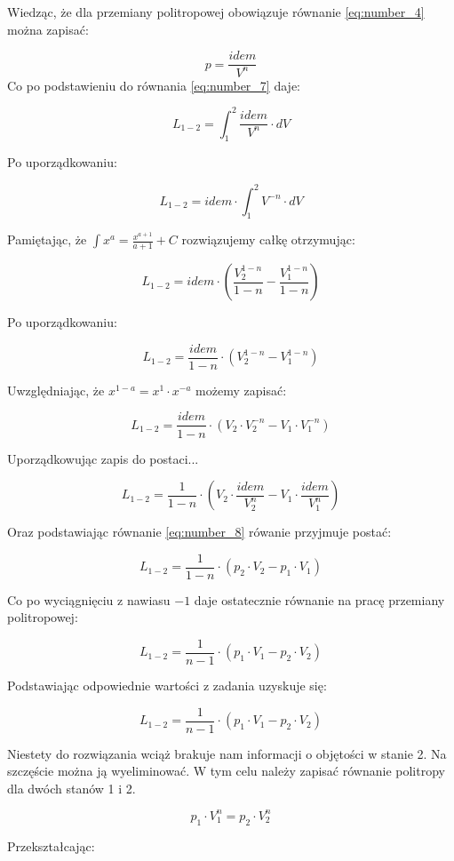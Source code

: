 Wiedząc, że dla przemiany politropowej obowiązuje równanie \eqref{eq:number_4} można zapisać:

\begin{equation}
p = \frac{idem}{V^n}
\label{eq:number_8}
\end{equation}
Co po podstawieniu do równania \eqref{eq:number_7} daje:

\[L_{1-2} = \int_1^2 {\frac{idem}{V^n} \cdot dV} \]

Po uporządkowaniu:

\[L_{1-2} = idem \cdot \int_1^2 V^{-n} \cdot dV \]

Pamiętając, że $\int x^a = \frac{x^{a+1}}{a+1} + C$ rozwiązujemy całkę otrzymując:

\[L_{1-2} = idem \cdot \left( \frac{V_2 ^{1-n}}{1-n} - \frac{V_1 ^{1-n}}{1-n} \right)\]

Po uporządkowaniu:

\[L_{1-2} = \frac{idem}{1-n} \cdot \left( V_2 ^{1-n} - V_1 ^{1-n} \right)\]

Uwzględniając, że $x^{1-a} = x^1 \cdot x^{-a}$ możemy zapisać:

\[L_{1-2} = \frac{idem}{1-n} \cdot \left( V_2 \cdot V_2^{-n} - V_1 \cdot V_1^{-n} \right)\]

Uporządkowując zapis do postaci...

\[L_{1-2} = \frac{1}{1-n} \cdot \left( V_2 \cdot \frac {idem}{V_2^{n}} - V_1 \cdot \frac{idem}{V_1^{n}} \right)\]

Oraz podstawiając równanie \eqref{eq:number_8} rówanie przyjmuje postać:

\[L_{1-2} = \frac{1}{1-n} \cdot \left( p_2 \cdot V_2 - p_1 \cdot V_1 \right)\]

Co po wyciągnięciu z nawiasu $-1$ daje ostatecznie równanie na pracę przemiany politropowej:

\[L_{1-2} = \frac{1}{n-1} \cdot \left( p_1 \cdot V_1 - p_2 \cdot V_2 \right)\]

Podstawiając odpowiednie wartości z zadania uzyskuje się:

\[L_{1-2} = \frac{1}{n-1} \cdot \left( p_1 \cdot V_1 - p_2 \cdot V_2 \right)\]

Niestety do rozwiązania wciąż brakuje nam informacji o objętości w stanie 2. Na szczęście można ją wyeliminować. W tym celu należy zapisać równanie politropy dla dwóch stanów 1 i 2. 

\[ p_1 \cdot V_1 ^n = p_2 \cdot V_2 ^n \]

Przekształcając:

